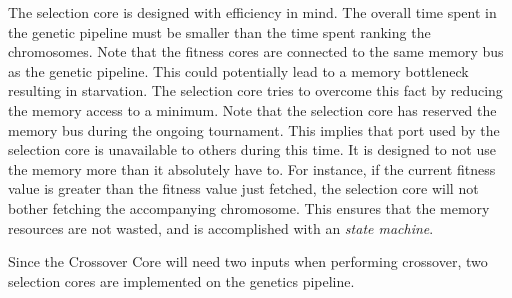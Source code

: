 The selection core is designed with efficiency in mind.
The overall time spent in the genetic pipeline must be smaller than the time spent ranking the chromosomes.
Note that the fitness cores are connected to the same memory bus as the genetic pipeline.
This could potentially lead to a memory bottleneck resulting in starvation.
The selection core tries to overcome this fact by reducing the memory access to a minimum.
Note that the selection core has reserved the memory bus during the ongoing tournament.
This implies that port used by the selection core is unavailable to others during this time.
It is designed to not use the memory more than it absolutely have to.
For instance, if the current fitness value is greater than the fitness value just fetched, the selection core will not bother fetching the accompanying chromosome.
This ensures that the memory resources are not wasted, and is accomplished with an \emph{state machine}. 

Since the Crossover Core will need two inputs when performing crossover, two selection cores are implemented on the genetics pipeline.


















